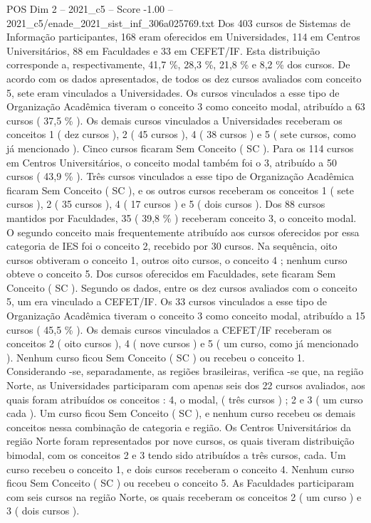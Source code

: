 \begin{textsample}{POS Dim 2 – 2021\_c5 – Score -1.00 – 2021\_c5/enade\_2021\_sist\_inf\_306a025769.txt}
Dos 403 cursos de Sistemas de Informação participantes, 168 eram oferecidos em Universidades, 114 em Centros Universitários, 88 em Faculdades e 33 em CEFET/IF.
Esta distribuição corresponde a, respectivamente, 41,7 \%, 28,3 \%, 21,8 \% e 8,2 \% dos cursos.
De acordo com os dados apresentados, de todos os dez cursos avaliados com conceito 5, sete eram vinculados a Universidades.
Os cursos vinculados a esse tipo de Organização Acadêmica tiveram o conceito 3 como conceito modal, atribuído a 63 cursos ( 37,5 \% ).
Os demais cursos vinculados a Universidades receberam os conceitos 1 ( dez cursos ), 2 ( 45 cursos ), 4 ( 38 cursos ) e 5 ( sete cursos, como já mencionado ).
Cinco cursos ficaram Sem Conceito ( SC ).
Para os 114 cursos em Centros Universitários, o conceito modal também foi o 3, atribuído a 50 cursos ( 43,9 \% ).
Três cursos vinculados a esse tipo de Organização Acadêmica ficaram Sem Conceito ( SC ), e os outros cursos receberam os conceitos 1 ( sete cursos ), 2 ( 35 cursos ), 4 ( 17 cursos ) e 5 ( dois cursos ).
Dos 88 cursos mantidos por Faculdades, 35 ( 39,8 \% ) receberam conceito 3, o conceito modal.
O segundo conceito mais frequentemente atribuído aos cursos oferecidos por essa categoria de IES foi o conceito 2, recebido por 30 cursos.
Na sequência, oito cursos obtiveram o conceito 1, outros oito cursos, o conceito 4 ; nenhum curso obteve o conceito 5.
Dos cursos oferecidos em Faculdades, sete ficaram Sem Conceito ( SC ).
Segundo os dados, entre os dez cursos avaliados com o conceito 5, um era vinculado a CEFET/IF.
Os 33 cursos vinculados a esse tipo de Organização Acadêmica tiveram o conceito 3 como conceito modal, atribuído a 15 cursos ( 45,5 \% ).
Os demais cursos vinculados a CEFET/IF receberam os conceitos 2 ( oito cursos ), 4 ( nove cursos ) e 5 ( um curso, como já mencionado ).
Nenhum curso ficou Sem Conceito ( SC ) ou recebeu o conceito 1.
Considerando -se, separadamente, as regiões brasileiras, verifica -se que, na região Norte, as Universidades participaram com apenas seis dos 22 cursos avaliados, aos quais foram atribuídos os conceitos : 4, o modal, ( três cursos ) ; 2 e 3 ( um curso cada ).
Um curso ficou Sem Conceito ( SC ), e nenhum curso recebeu os demais conceitos nessa combinação de categoria e região.
Os Centros Universitários da região Norte foram representados por nove cursos, os quais tiveram distribuição bimodal, com os conceitos 2 e 3 tendo sido atribuídos a três cursos, cada.
Um curso recebeu o conceito 1, e dois cursos receberam o conceito 4.
Nenhum curso ficou Sem Conceito ( SC ) ou recebeu o conceito 5.
As Faculdades participaram com seis cursos na região Norte, os quais receberam os conceitos 2 ( um curso ) e 3 ( dois cursos ).

\end{textsample}
